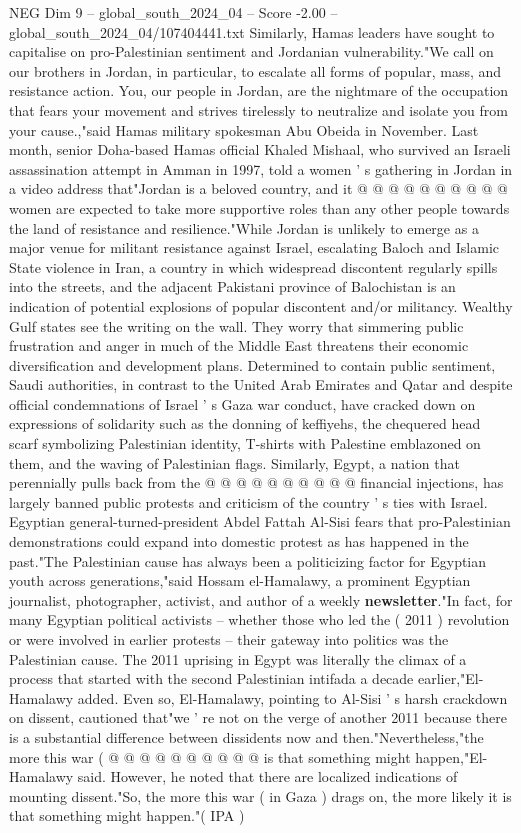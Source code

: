 \begin{textsample}{NEG Dim 9 – global\_south\_2024\_04 – Score -2.00 – global\_south\_2024\_04/107404441.txt}
Similarly, Hamas leaders have sought to capitalise on pro-Palestinian sentiment and Jordanian vulnerability."We call on our brothers in Jordan, in particular, to escalate all forms of popular, mass, and resistance action.
You, our people in Jordan, are the nightmare of the occupation that fears your movement and strives tirelessly to neutralize and isolate you from your cause.,"said Hamas military spokesman Abu Obeida in November.
Last month, senior Doha-based Hamas official Khaled Mishaal, who survived an Israeli assassination attempt in Amman in 1997, told a women ' s gathering in Jordan in a video address that"Jordan is a beloved country, and it @ @ @ @ @ @ @ @ @ @ women are expected to take more supportive roles than any other people towards the land of resistance and resilience."While Jordan is unlikely to emerge as a major venue for militant resistance against Israel, escalating Baloch and Islamic State violence in Iran, a country in which widespread discontent regularly spills into the streets, and the adjacent Pakistani province of Balochistan is an indication of potential explosions of popular discontent and/or militancy.
Wealthy Gulf states see the writing on the wall.
They worry that simmering public frustration and anger in much of the Middle East threatens their economic diversification and development plans.
Determined to contain public sentiment, Saudi authorities, in contrast to the United Arab Emirates and Qatar and despite official condemnations of Israel ' s Gaza war conduct, have cracked down on expressions of solidarity such as the donning of keffiyehs, the chequered head scarf symbolizing Palestinian identity, T-shirts with Palestine emblazoned on them, and the waving of Palestinian flags.
Similarly, Egypt, a nation that perennially pulls back from the @ @ @ @ @ @ @ @ @ @ financial injections, has largely banned public protests and criticism of the country ' s ties with Israel.
Egyptian general-turned-president Abdel Fattah Al-Sisi fears that pro-Palestinian demonstrations could expand into domestic protest as has happened in the past."The Palestinian cause has always been a politicizing factor for Egyptian youth across generations,"said Hossam el-Hamalawy, a prominent Egyptian journalist, photographer, activist, and author of a weekly \textbf{newsletter}."In fact, for many Egyptian political activists -- whether those who led the ( 2011 ) revolution or were involved in earlier protests -- their gateway into politics was the Palestinian cause.
The 2011 uprising in Egypt was literally the climax of a process that started with the second Palestinian intifada a decade earlier,"El-Hamalawy added.
Even so, El-Hamalawy, pointing to Al-Sisi ' s harsh crackdown on dissent, cautioned that"we ' re not on the verge of another 2011 because there is a substantial difference between dissidents now and then."Nevertheless,"the more this war ( @ @ @ @ @ @ @ @ @ @ is that something might happen,"El-Hamalawy said.
However, he noted that there are localized indications of mounting dissent."So, the more this war ( in Gaza ) drags on, the more likely it is that something might happen."( IPA )

\end{textsample}
